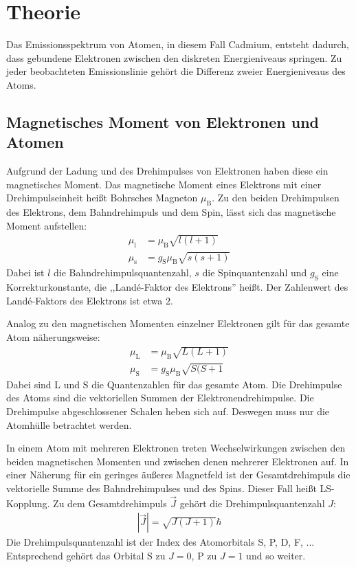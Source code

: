 \section{Theorie}

Das Emissionsspektrum von Atomen, in diesem Fall Cadmium, entsteht dadurch, dass gebundene Elektronen zwischen den diskreten Energieniveaus springen.
Zu jeder beobachteten Emissionslinie gehört die Differenz zweier Energieniveaus des Atoms.

\subsection{Magnetisches Moment von Elektronen und Atomen}

Aufgrund der Ladung und des Drehimpulses von Elektronen haben diese ein magnetisches Moment.
Das magnetische Moment eines Elektrons mit einer Drehimpulseinheit heißt Bohrsches Magneton $\mu_\text{B}$.
Zu den beiden Drehimpulsen des Elektrons, dem Bahndrehimpuls und dem Spin, lässt sich das magnetische Moment aufstellen:
\begin{align}
	\mu_\text{l} & = \mu_\text{B} \sqrt{l (l + 1)} \\
	\mu_\text{s} & = g_\text{S}\mu_\text{B} \sqrt{s (s + 1)}
\end{align}
Dabei ist $l$ die Bahndrehimpulsquantenzahl, $s$ die Spinquantenzahl und $g_\text{S}$ eine Korrekturkonstante, die ,,Landé-Faktor des Elektrons'' heißt.
Der Zahlenwert des Landé-Faktors des Elektrons ist etwa $2$.

Analog zu den magnetischen Momenten einzelner Elektronen gilt für das gesamte Atom näherungsweise:
\begin{align}
	\mu_\text{L} & = \mu_\text{B} \sqrt{L (L + 1)} \\
	\mu_\text{S} & = g_\text{S}\mu_\text{B} \sqrt{S (S + 1}
\end{align}
Dabei sind L und S die Quantenzahlen für das gesamte Atom.
Die Drehimpulse des Atoms sind die vektoriellen Summen der Elektronendrehimpulse.
Die Drehimpulse abgeschlossener Schalen heben sich auf.
Deswegen muss nur die Atomhülle betrachtet werden.

In einem Atom mit mehreren Elektronen treten Wechselwirkungen zwischen den beiden magnetischen Momenten und zwischen denen mehrerer Elektronen auf.
In einer Näherung für ein geringes äußeres Magnetfeld ist der Gesamtdrehimpuls die vektorielle Summe des Bahndrehimpulses und des Spins.
Dieser Fall heißt LS-Kopplung.
Zu dem Gesamtdrehimpuls $\vec{J}$ gehört die Drehimpulsquantenzahl $J$:
\begin{align}
	|\vec{J}| = \sqrt{J (J + 1)} \hbar
\end{align}
Die Drehimpulsquantenzahl ist der Index des Atomorbitals S, P, D, F, ...
Entsprechend gehört das Orbital S zu $J = 0$, P zu $J = 1$ und so weiter.

